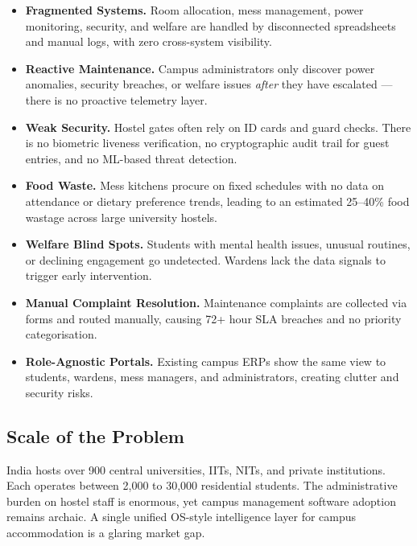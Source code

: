 \documentclass[12pt, a4paper]{article}
\begin{document}
\begin{itemize}[leftmargin=1.2em, itemsep=4pt]
  \item \textbf{Fragmented Systems.} Room allocation, mess management, power monitoring, security, and welfare are handled by disconnected spreadsheets and manual logs, with zero cross-system visibility.

  \item \textbf{Reactive Maintenance.} Campus administrators only discover power anomalies, security breaches, or welfare issues \textit{after} they have escalated — there is no proactive telemetry layer.

  \item \textbf{Weak Security.} Hostel gates often rely on ID cards and guard checks. There is no biometric liveness verification, no cryptographic audit trail for guest entries, and no ML-based threat detection.

  \item \textbf{Food Waste.} Mess kitchens procure on fixed schedules with no data on attendance or dietary preference trends, leading to an estimated 25--40\% food wastage across large university hostels.

  \item \textbf{Welfare Blind Spots.} Students with mental health issues, unusual routines, or declining engagement go undetected. Wardens lack the data signals to trigger early intervention.

  \item \textbf{Manual Complaint Resolution.} Maintenance complaints are collected via forms and routed manually, causing 72+ hour SLA breaches and no priority categorisation.

  \item \textbf{Role-Agnostic Portals.} Existing campus ERPs show the same view to students, wardens, mess managers, and administrators, creating clutter and security risks.
\end{itemize}

\vspace{10pt}

\subsection{Scale of the Problem}

India hosts over 900 central universities, IITs, NITs, and private institutions. Each operates between 2,000 to 30,000 residential students. The administrative burden on hostel staff is enormous, yet campus management software adoption remains archaic. A single unified OS-style intelligence layer for campus accommodation is a glaring market gap.
\end{document}
